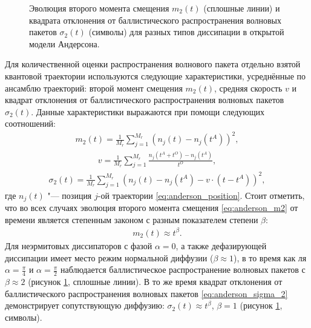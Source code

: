 \begin{figure}[h]
	\caption[Характеристика динамики квантовых траекторий на квантовых аттракторах]{
		Эволюция второго момента смещения \(m_2(t)\) (сплошные линии) и квадрата отклонения от баллистического распространения волновых пакетов \(\sigma_2(t)\) (символы) для разных типов диссипации в открытой модели Андерсона.
	}
	\label{fig:anderson_prb_3}
\end{figure}

Для количественной оценки распространения волнового пакета отдельно взятой квантовой траектории используются следующие характеристики, усреднённые по ансамблю траекторий: второй момент смещения \(m_2(t)\), средняя скорость \(v\) и квадрат отклонения от баллистического распространения волновых пакетов \(\sigma_2(t)\). Данные характеристики выражаются при помощи следующих соотношений:
\begin{equation}
\label{eq:anderson_m2}
\begin{gathered}
m_2(t) = \frac{1}{M_r} \sum_{j=1}^{M_r} \left( n_j(t) - n_j(t^A) \right)^2,
\end{gathered}
\end{equation}
\begin{equation}
\label{eq:anderson_velocity}
\begin{gathered}
v = \frac{1}{M_r} \sum_{j=1}^{M_r} \frac{n_j(t^A + t^O) - n_j(t^A)}{t^O},
\end{gathered}
\end{equation}
\begin{equation}
\label{eq:anderson_sigma_2}
\begin{gathered}
\sigma_2(t) = \frac{1}{M_r} \sum_{j=1}^{M_r} \left( n_j(t) - n_j(t^A) - v \cdot (t-t^A) \right)^2,
\end{gathered}
\end{equation}
где \(n_j(t)\) "--- позиция \(j\)-ой траектории \cref{eq:anderson_position}. Стоит отметить, что во всех случаях эволюция второго момента смещения \cref{eq:anderson_m2} от времени является степенным законом с разным показателем степени \(\beta\):
\begin{equation}
\label{eq:anderson_m2_fit}
\begin{gathered}
m_2(t) \approx t^\beta .
\end{gathered}
\end{equation}
Для неэрмитовых диссипаторов с фазой \(\alpha=0\), а также дефазирующей диссипации имеет место режим нормальной диффузии (\(\beta \approx 1\)), в то время как ля \(\alpha=\frac{\pi}{4}\) и \(\alpha=\frac{\pi}{2}\) наблюдается баллистическое распространение волновых пакетов с \(\beta \approx 2\) (рисунок \cref{fig:anderson_prb_3}, сплошные линии). В то же время квадрат отклонения от баллистического распространения волновых пакетов \cref{eq:anderson_sigma_2} демонстрирует сопутствующую диффузию: \(\sigma_2(t) \approx t^\beta\), \(\beta=1\) (рисунок \cref{fig:anderson_prb_3}, символы).

